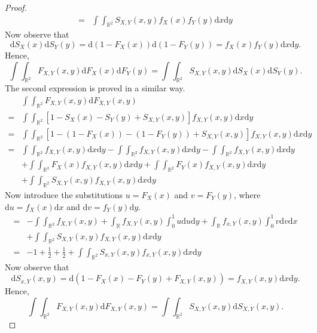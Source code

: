 \begin{proof}
\begin{align*}
        =&\int\int_{\mathbb{R}^2}S_{X,Y}\left(x,y\right)f_X\left(x\right)f_Y\left(y\right)\mathrm{d}x\mathrm{d}y
    \end{align*}
    Now observe that $$\mathrm{d}S_X\left(x\right)\mathrm{d}S_Y\left(y\right)=\mathrm{d}\left(1-F_X\left(x\right)\right)\mathrm{d}\left(1-F_Y\left(y\right)\right)=f_X\left(x\right)f_Y\left(y\right)\mathrm{d}x\mathrm{d}y.$$ Hence, $$\int\int_{\mathbb{R}^2}F_{X,Y}\left(x,y\right)\mathrm{d}F_X\left(x\right)\mathrm{d}F_Y\left(y\right)=\int\int_{\mathbb{R}^2}S_{X,Y}\left(x,y\right)\mathrm{d}S_X\left(x\right)\mathrm{d}S_{Y}\left(y\right).$$
    The second expression is proved in a similar way.
    \begin{align*}
        &\int\int_{\mathbb{R}^2}F_{X,Y}\left(x,y\right)\mathrm{d}F_{X,Y}\left(x,y\right)\\
        =&\int\int_{\mathbb{R}^2}\left[1-S_X\left(x\right)-S_Y\left(y\right)+S_{X,Y}\left(x,y\right)\right]f_{X,Y}\left(x,y\right)\mathrm{d}x\mathrm{d}y\\
        =&\int\int_{\mathbb{R}^2}\left[1-\left(1-F_X\left(x\right)\right)-\left(1-F_Y\left(y\right)\right)+S_{X,Y}\left(x,y\right)\right]f_{X,Y}\left(x,y\right)\mathrm{d}x\mathrm{d}y\\
        =&\int\int_{\mathbb{R}^2}f_{X,Y}\left(x,y\right)\mathrm{d}x\mathrm{d}y-\int\int_{\mathbb{R}^2}f_{X,Y}\left(x,y\right)\mathrm{d}x\mathrm{d}y-\int\int_{\mathbb{R}^2}f_{X,Y}\left(x,y\right)\mathrm{d}x\mathrm{d}y\\
        &+\int\int_{\mathbb{R}^2}F_X\left(x\right)f_{X,Y}\left(x,y\right)\mathrm{d}x\mathrm{d}y+\int\int_{\mathbb{R}^2}F_Y\left(x\right)f_{X,Y}\left(x,y\right)\mathrm{d}x\mathrm{d}y\\
        &+\int\int_{\mathbb{R}^2}S_{X,Y}\left(x,y\right)f_{X,Y}\left(x,y\right)\mathrm{d}x\mathrm{d}y
    \end{align*}
    Now introduce the substitutions $u=F_X\left(x\right)$ and $v=F_Y\left(y\right)$, where $\mathrm{d}u=f_X\left(x\right)\mathrm{d}x$ and $\mathrm{d}v=f_Y\left(y\right)\mathrm{d}y$.
    \begin{align*}
        =&-\int\int_{\mathbb{R}^2}f_{X,Y}\left(x,y\right)+\int_{\mathbb{R}}f_{X,Y}\left(x,y\right)\int_0^1u\mathrm{d}u\mathrm{d}y+\int_{\mathbb{R}}f_{x,Y}\left(x,y\right)\int_0^1v\mathrm{d}v\mathrm{d}x\\
        &+\int\int_{\mathbb{R}^2}S_{X,Y}\left(x,y\right)f_{X,Y}\left(x,y\right)\mathrm{d}x\mathrm{d}y\\
        =&-1+\frac{1}{2}+\frac{1}{2}+\int\int_{\mathbb{R}^2}S_{x,Y}\left(x,y\right)f_{x,Y}\left(x,y\right)\mathrm{d}x\mathrm{d}y
    \end{align*}
    Now observe that $$\mathrm{d}S_{x,Y}\left(x,y\right)=\mathrm{d}\left(1-F_X\left(x\right)-F_Y\left(y\right)+F_{X,Y}\left(x,y\right)\right)=f_{X,Y}\left(x,y\right)\mathrm{d}x\mathrm{d}y.$$ Hence, $$\int\int_{\mathbb{R}^2}F_{X,Y}\left(x,y\right)\mathrm{d}F_{X,Y}\left(x,y\right)=\int\int_{\mathbb{R}^2}S_{X,Y}\left(x,y\right)\mathrm{d}S_{X,Y}\left(x,y\right).$$
\end{proof}